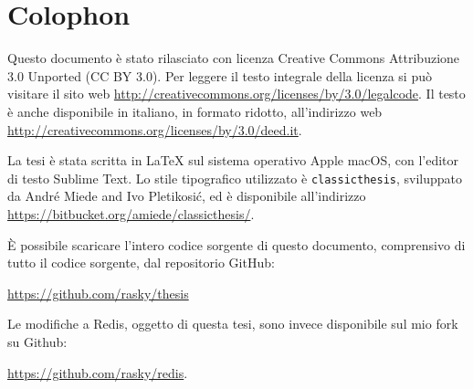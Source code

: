 \pagestyle{empty}

\hfill

\vfill


\section*{Colophon}

Questo documento è stato rilasciato con licenza Creative Commons Attribuzione
3.0 Unported (CC BY 3.0). Per leggere il testo integrale della licenza si può
visitare il sito web \url{http://creativecommons.org/licenses/by/3.0/legalcode}. 
Il testo è anche disponibile in italiano, in formato ridotto, all'indirizzo web
\url{http://creativecommons.org/licenses/by/3.0/deed.it}.

La tesi è stata scritta in \LaTeX{} sul sistema operativo Apple macOS, con
l'editor di testo Sublime Text. Lo stile tipografico utilizzato è \texttt{classicthesis},
sviluppato da Andr\'e Miede and Ivo Pletikosić, ed è disponibile all'indirizzo
\url{https://bitbucket.org/amiede/classicthesis/}.

È possibile scaricare l'intero codice sorgente di questo documento, comprensivo 
di tutto il codice sorgente, dal repositorio GitHub:
\begin{center}
\url{https://github.com/rasky/thesis}
\end{center}

Le modifiche a Redis, oggetto di questa tesi, sono invece disponibile sul mio 
fork su Github:
\begin{center}
\url{https://github.com/rasky/redis}.
\end{center}

\bigskip

\noindent\finalVersionString


